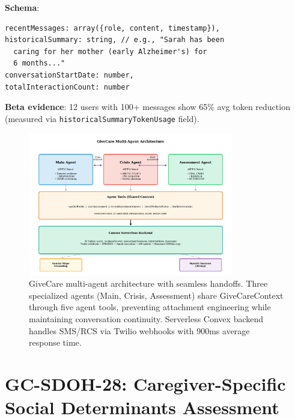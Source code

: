 \documentclass{article}%
\begin{document}
\textbf{Schema}:
\begin{verbatim}
recentMessages: array({role, content, timestamp}),
historicalSummary: string, // e.g., "Sarah has been
  caring for her mother (early Alzheimer's) for
  6 months..."
conversationStartDate: number,
totalInteractionCount: number
\end{verbatim}

\textbf{Beta evidence}: 12 users with 100+ messages show 65\% avg token reduction (measured via \texttt{historicalSummaryTokenUsage} field).

%
\begin{figure}[htbp]%
\centering%
\includegraphics[width=0.8\textwidth]{fig6_multiagent_architecture.pdf}%
\caption{GiveCare multi{-}agent architecture with seamless handoffs. Three specialized agents (Main, Crisis, Assessment) share GiveCareContext through five agent tools, preventing attachment engineering while maintaining conversation continuity. Serverless Convex backend handles SMS/RCS via Twilio webhooks with 900ms average response time.}%
\label{fig:multiagent}%
\end{figure}%
\section{GC{-}SDOH{-}28: Caregiver{-}Specific Social Determinants Assessment}%
\label{sec:GC{-}SDOH{-}28Caregiver{-}SpecificSocialDeterminantsAssessment}%
%
\end{document}
